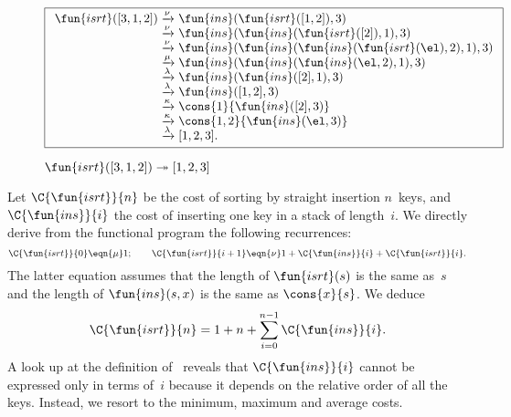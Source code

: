 \begin{figure}
\begin{equation*}
\boxed{%
\begin{array}{r@{\;}l@{\;}l}
\fun{isrt}([3,1,2])
& \xrightarrow{\smash{\nu}} & \fun{ins}(\fun{isrt}([1,2]),3)\\
& \xrightarrow{\smash{\nu}}
& \fun{ins}(\fun{ins}(\fun{isrt}([2]),1),3)\\
& \xrightarrow{\smash{\nu}}
& \fun{ins}(\fun{ins}(\fun{ins}(\fun{isrt}(\el),2),1),3)\\
& \xrightarrow{\smash{\mu}}
& \fun{ins}(\fun{ins}(\fun{ins}(\el,2),1),3)\\
& \xrightarrow{\smash{\lambda}}
& \fun{ins}(\fun{ins}([2],1),3)\\
& \xrightarrow{\smash{\lambda}}
& \fun{ins}([1,2],3)\\
& \xrightarrow{\smash{\kappa}}
& \cons{1}{\fun{ins}([2],3)}\\
& \xrightarrow{\smash{\kappa}}
& \cons{1,2}{\fun{ins}(\el,3)}\\
& \xrightarrow{\smash{\lambda}}
& [1,2,3].
\end{array}}
\end{equation*}
\caption{\(\fun{isrt}([3,1,2]) \twoheadrightarrow [1,2,3]\)}
\label{fig:isrt_312}
\end{figure}

Let \(\C{\fun{isrt}}{n}\) be the cost
of sorting by straight insertion \(n\)~keys, and \(\C{\fun{ins}}{i}\)
the cost of inserting one key in a stack of length~\(i\). We directly
derive from the functional program the following recurrences:
\begin{equation*}
\C{\fun{isrt}}{0}   \eqn{\smash{\mu}} 1;\qquad
\C{\fun{isrt}}{i+1} \eqn{\smash{\nu}} 1 + \C{\fun{ins}}{i} +
  \C{\fun{isrt}}{i}.
\end{equation*}
The latter equation assumes that the length of \(\fun{isrt}(s)\) is
the same as~\(s\) and the length of \(\fun{ins}(s,x)\) is the same as
\(\cons{x}{s}\). We deduce
\begin{equation}
\C{\fun{isrt}}{n} = 1 + n + \sum_{i=0}^{n-1}\C{\fun{ins}}{i}.
\label{eq:cost_isrt}
\end{equation}
A look up at the definition of~ reveals that
\(\C{\fun{ins}}{i}\) cannot be expressed only in terms of~\(i\)
because it depends on the relative order of all the keys. Instead, we
resort to the minimum, maximum and average
costs.

